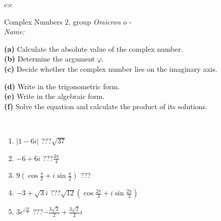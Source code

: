 \documentclass[10pt]{report}
\newcommand\omicron{o}
\begin{document}
\newpage
\thispagestyle{empty}
\begin{tabular}{c:c}
\begin{minipage}[c][104.5mm][t]{0.5\linewidth}
\begin{center}
\vspace{5mm}
{\huge Complex Numbers 2, group \textit{Omicron $\omicron$} -}\\[5mm]
\textit{Name:}\phantom{xxxxxxxxxxxxxxxxxxxxxxxxxxxxxxxxxxxxxxxxxxxxxxxxxxxxxxxxxxxxxxxxx}\\[5mm]
\begin{minipage}{0.95\linewidth}
\begin{center}
{\small \begin{minipage}{0.44\textwidth} \raggedright
\textbf{(a)} Calculate the absolute value of the complex number. \\[1mm]
\textbf{(b)} Determine the argument \(\varphi\). \\[1mm]
\textbf{(c)} Decide whether the complex number lies on the imaginary axis. \end{minipage} \begin{minipage}{0.54\textwidth}
\textbf{(d)} Write in the trigonometric form. \\[1mm]
\textbf{(e)} Write in the algebraic form. \\[1mm]
\textbf{(f)} Solve the equation and calculate the product of its solutions.
\end{minipage}
}
\end{center}
\end{minipage}
\\[1mm]
\begin{minipage}{0.79\linewidth}
\begin{center}
\begin{varwidth}{\linewidth}
\setlength{\itemsep}{0pt}
\begin{enumerate}
\large
\item $|1-6i|$\quad \dotfill\; ???\;\dotfill \quad $\sqrt{37}$
\item $-6+6i$\quad \dotfill\; ???\;\dotfill \quad $\frac{3\pi}{4}$
\item $9\left(\cos{\frac{\pi}{2}}+i\sin{\frac{\pi}{2}}\right)$\quad \dotfill\; ???\;\dotfill \quad {}
\item $-3+\sqrt{3}i$\quad \dotfill\; ???\;\dotfill \quad $\sqrt{12}\left(\cos{\frac{2\pi}{3}}+i\sin{\frac{2\pi}{3}}\right)$
\item $3e^{i\frac{3\pi}{4}}$\quad \dotfill\; ???\;\dotfill \quad $-\frac{3\sqrt{2}}{2}+\frac{3\sqrt{2}}{2}i$

\end{enumerate}
\end{varwidth}
\end{center}
\end{minipage}
\end{center}
\end{minipage}
\end{tabular}
\end{document}
